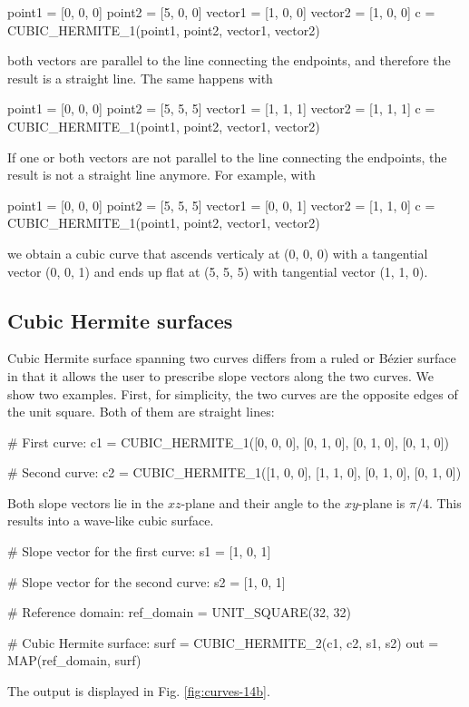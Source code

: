 \begin{bluecode}
point1 = [0, 0, 0]
point2 = [5, 0, 0]
vector1 = [1, 0, 0]
vector2 = [1, 0, 0]
c = CUBIC_HERMITE_1(point1, point2, vector1, vector2)
\end{bluecode}
both vectors are parallel to the line connecting the endpoints,
and therefore the result is a straight line. The same happens 
with  

\begin{bluecode}
point1 = [0, 0, 0]
point2 = [5, 5, 5]
vector1 = [1, 1, 1]
vector2 = [1, 1, 1]
c = CUBIC_HERMITE_1(point1, point2, vector1, vector2)
\end{bluecode}
If one or both vectors are not parallel to the line connecting 
the endpoints, the result is not a straight line anymore. 
For example, with 
 
\begin{bluecode}
point1 = [0, 0, 0]
point2 = [5, 5, 5]
vector1 = [0, 0, 1]
vector2 = [1, 1, 0]
c = CUBIC_HERMITE_1(point1, point2, vector1, vector2)
\end{bluecode}
we obtain a cubic curve that ascends verticaly at (0, 0, 0) with
a tangential vector (0, 0, 1) and ends up flat at (5, 5, 5) with 
tangential vector (1, 1, 0).

\subsection{Cubic Hermite surfaces}

Cubic Hermite surface 
spanning two curves differs from a ruled or B\'ezier surface in that 
it allows the user to prescribe slope vectors along the 
two curves. We show two examples. First, for simplicity,
the two curves are the opposite edges of the unit square. 
Both of them are straight lines:

\begin{bluecode}
# First curve:
c1 = CUBIC_HERMITE_1([0, 0, 0], [0, 1, 0], [0, 1, 0], [0, 1, 0])

# Second curve:
c2 = CUBIC_HERMITE_1([1, 0, 0], [1, 1, 0], [0, 1, 0], [0, 1, 0])
\end{bluecode}
Both slope vectors lie in the $xz$-plane and their angle to the $xy$-plane
is $\pi/4$. This results into a wave-like cubic surface.

\begin{bluecode}
# Slope vector for the first curve:
s1 = [1, 0, 1]

# Slope vector for the second curve:
s2 = [1, 0, 1]

# Reference domain:
ref_domain = UNIT_SQUARE(32, 32)

# Cubic Hermite surface:
surf = CUBIC_HERMITE_2(c1, c2, s1, s2)
out = MAP(ref_domain, surf)
\end{bluecode}
The output is displayed in Fig. \ref{fig:curves-14b}.


